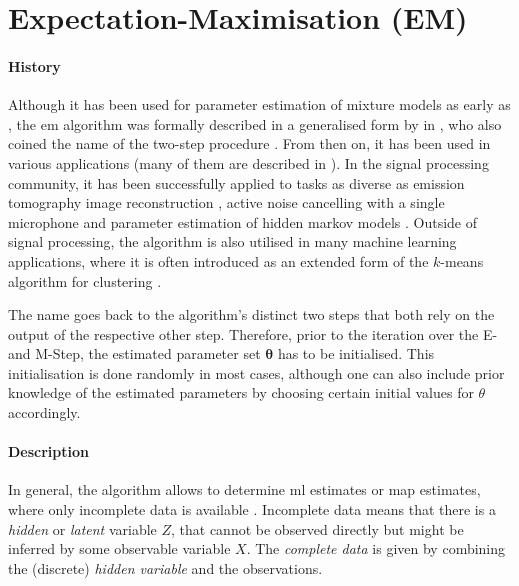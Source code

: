 \section{Expectation-Maximisation (EM)}
\label{sec:em}

\paragraph{History}
Although it has been used for parameter estimation of mixture models as early as \citeyear{Newcomb1886} \cite{Newcomb1886}, the \gls{em} algorithm was formally described in a generalised form by \citeauthor{Dempster1977} in \citeyear{Dempster1977}, who also coined the name of the two-step procedure \cite{Dempster1977}. From then on, it has been used in various applications (many of them are described in \cite{McLachlan2008}). In the signal processing community, it has been successfully applied to tasks as diverse as emission tomography image reconstruction \cite{Shepp1982}, active noise cancelling with a single microphone \cite{Feder1989} and parameter estimation of hidden markov models \cite{Moon1996}. Outside of signal processing, the algorithm is also utilised in many machine learning applications, where it is often introduced as an extended form of the $k$-means algorithm for clustering \cite{Bishop2006}.

The name  goes back to the algorithm's distinct two steps that both rely on the output of the respective other step. Therefore, prior to the iteration over the E- and M-Step, the estimated parameter set $\bm \theta$ has to be initialised. This initialisation is done randomly in most cases, although one can also include prior knowledge of the estimated parameters by choosing certain initial values for $\theta$ accordingly.

\paragraph{Description} In general, the algorithm allows to determine \gls{ml} estimates or \gls{map} estimates, where only incomplete data is available \cite[p.1]{Dempster1977}. Incomplete data means that there is a \textit{hidden} or \textit{latent} variable $Z$, that cannot be observed directly but might be inferred by some observable variable $X$. The \textit{complete data} is given by combining the (discrete) \textit{hidden variable} and the observations.


